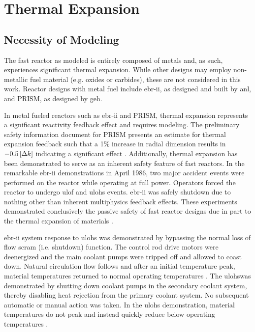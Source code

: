\chapter{Thermal Expansion}
\label{ch:thermalExpansion}

\section{Necessity of Modeling}
  The fast reactor as modeled is entirely composed of metals and, as such,
  experiences significant thermal expansion. While other designs may employ
  non-metallic fuel material (e.g. oxides or carbides), these are not considered
  in this work. Reactor designs with metal fuel include \gls{ebr-ii}, as
  designed and built by \gls{anl}, and PRISM, as designed by \gls{geh}.

  In metal fueled reactors such as \gls{ebr-ii} and PRISM, thermal expansion
  represents a significant reactivity feedback effect and requires modeling.
  The preliminary safety information document for PRISM presents an estimate for
  thermal expansion feedback such that a 1\% increase in radial dimension
  results in $-0.5 \left[\text{{$\Delta k$}}\right]$ indicating a significant effect
  \cite{GEFR793}. Additionally, thermal expansion has been demonstrated to serve
  as an inherent safety feature of fast reactors. In the remarkable \gls{ebr-ii}
  demonstrations in April 1986, two major accident events were performed on the
  reactor while operating at full power. Operators forced the reactor to undergo
  \gls{ulof} and \gls{ulohs} events. \gls{ebr-ii} was safely shutdown due to
  nothing other than inherent multiphysics feedback effects. These experiments
  demonstrated conclusively the passive safety of fast reactor designs due in
  part to the thermal expansion of materials \cite{PlentifulEnergy}.

  \gls{ebr-ii} system response to \gls{ulohs} was demonstrated by bypassing the
  normal loss of flow scram (i.e. shutdown) function. The control rod drive
  motors were deenergized and the main coolant pumps were tripped off and
  allowed to coast down. Natural circulation flow follows and after an initial
  temperature peak, material temperatures returned to normal operating
  temperatures \cite{ebriitests}. The \gls{ulohs}was demonstrated by shutting
  down coolant pumps in the secondary coolant system, thereby disabling heat
  rejection from the primary coolant system. No subsequent automatic or manual
  action was taken. In the \gls{ulohs} demonstration, material temperatures do
  not peak and instead quickly reduce below operating temperatures
  \cite{ebriitests}.

